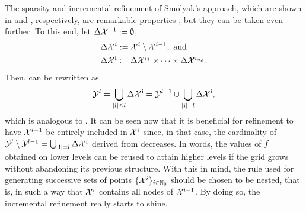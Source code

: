 The sparsity and incremental refinement of Smolyak's approach, which are shown
in  and , respectively, are
remarkable properties \perse, but they can be taken even further. To this end,
let $\Delta\mathcal{X}^{-1} := \emptyset$,
\begin{align*}
  & \Delta\mathcal{X}^i := \mathcal{X}^i \setminus \mathcal{X}^{i - 1}, \text{ and} \\
  & \Delta\mathcal{X}^{\mathbf{i}} := \Delta\mathcal{X}^{i_1} \times \cdots \times \Delta\mathcal{X}^{i_{n_\text{d}}}.
\end{align*}
Then,  can be rewritten as
\begin{equation} \elab{smolyak-grid-incremental}
  \Y^l = \bigcup_{|\vi| \leq l} \Delta\X^\vi = \Y^{l - 1} \cup \bigcup_{|\vi| = l} \Delta\X^\vi,
\end{equation}
which is analogous to . It can be seen now that it is
beneficial for refinement to have $\mathcal{X}^{i - 1}$ be entirely included in $\mathcal{X}^i$
since, in that case, the cardinality of $\mathcal{Y}^l \setminus \mathcal{Y}^{l - 1} =
\bigcup_{|\mathbf{i}| = l} \Delta\mathcal{X}^{\mathbf{i}}$ derived from 
decreases. In words, the values of $f$ obtained on lower levels can be reused
to attain higher levels if the grid grows without abandoning its previous
structure. With this in mind, the rule used for generating successive sets of
points $\{ \mathcal{X}^i \}_{i \in \mathbb{N}_0}$ should be chosen to be nested, that is, in
such a way that $\mathcal{X}^i$ contains all nodes of $\mathcal{X}^{i - 1}$. By doing so, the
incremental refinement really starts to shine.

